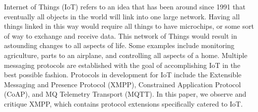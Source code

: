 Internet of Things (IoT) refers to an idea that has been around since
1991\cite{iot_bonanza} that eventually all objects in the world will link into
one large network. Having all things linked in this way would require all
things to have microchips, or some sort of way to exchange and receive data.
This network of Things would result in astounding changes to all aspects of
life. Some examples include monitoring agriculture, parts to an airplane, and
controlling all aspects of a home. Multiple messaging protocols are
established with the goal of accomplishing IoT in the best possible fashion.
Protocols in development for IoT include the Extensible Messaging and Presence
Protocol (XMPP), Constrained Application Protocol (CoAP), and MQ Telemetry
Transport (MQTT)\cite{iot_linkedin}. In this paper, we observe and critique XMPP,
which contains protocol extensions specifically catered to IoT.

